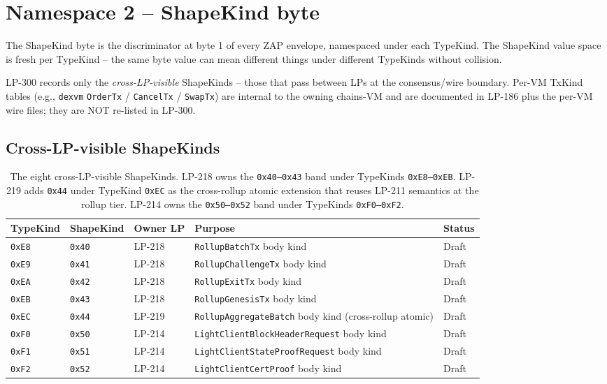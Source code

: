 \section{Namespace 2 -- ShapeKind byte}
\label{sec:shapekind}

The ShapeKind byte is the discriminator at byte 1 of every ZAP
envelope, namespaced under each TypeKind. The ShapeKind value space
is fresh per TypeKind -- the same byte value can mean different
things under different TypeKinds without collision.

LP-300 records only the \emph{cross-LP-visible} ShapeKinds -- those
that pass between LPs at the consensus/wire boundary. Per-VM TxKind
tables (e.g., \texttt{dexvm} \texttt{OrderTx} / \texttt{CancelTx} /
\texttt{SwapTx}) are internal to the owning chains-VM and are
documented in LP-186 plus the per-VM wire files; they are NOT
re-listed in LP-300.

\subsection{Cross-LP-visible ShapeKinds}

\begin{table}[h]
\centering
\small
\begin{tabular}{@{}p{1.8cm}p{1.8cm}p{1.8cm}p{6.0cm}p{1.2cm}@{}}
\toprule
\textbf{TypeKind} & \textbf{ShapeKind} & \textbf{Owner LP} & \textbf{Purpose} & \textbf{Status} \\
\midrule
\texttt{0xE8} & \texttt{0x40} & LP-218 & \texttt{RollupBatchTx} body kind & Draft \\
\texttt{0xE9} & \texttt{0x41} & LP-218 & \texttt{RollupChallengeTx} body kind & Draft \\
\texttt{0xEA} & \texttt{0x42} & LP-218 & \texttt{RollupExitTx} body kind & Draft \\
\texttt{0xEB} & \texttt{0x43} & LP-218 & \texttt{RollupGenesisTx} body kind & Draft \\
\texttt{0xEC} & \texttt{0x44} & LP-219 & \texttt{RollupAggregateBatch} body kind (cross-rollup atomic) & Draft \\
\texttt{0xF0} & \texttt{0x50} & LP-214 & \texttt{LightClientBlockHeaderRequest} body kind & Draft \\
\texttt{0xF1} & \texttt{0x51} & LP-214 & \texttt{LightClientStateProofRequest} body kind & Draft \\
\texttt{0xF2} & \texttt{0x52} & LP-214 & \texttt{LightClientCertProof} body kind & Draft \\
\bottomrule
\end{tabular}
\caption{The eight cross-LP-visible ShapeKinds. LP-218 owns the
\texttt{0x40--0x43} band under TypeKinds \texttt{0xE8--0xEB}. LP-219
adds \texttt{0x44} under TypeKind \texttt{0xEC} as the cross-rollup
atomic extension that reuses LP-211 semantics at the rollup tier.
LP-214 owns the \texttt{0x50--0x52} band under TypeKinds
\texttt{0xF0--0xF2}.}
\label{tab:shapekind}
\end{table}

